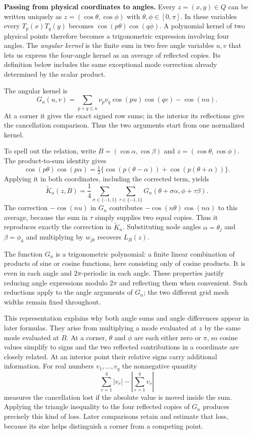 \noindent\textbf{Passing from physical coordinates to angles.}
Every $z=(x,y)\in Q$ can be written uniquely as
$z=(\cos\theta,\cos\phi)$ with $\theta,\phi\in[0,\pi]$.
In these variables every $T_p(x)T_q(y)$ becomes
$\cos(p\theta)\cos(q\phi)$. A polynomial kernel of two physical
points therefore becomes a trigonometric expression involving four
angles. The \emph{angular kernel} is the finite sum in two free angle
variables $u,v$ that lets us express the four-angle kernel as an average
of reflected copies. Its definition below includes the same exceptional
mode correction already determined by the scalar product.

The angular kernel is
\begin{equation}\label{eq:angular-kernel}
 G_n(u,v)=\sum_{p+q\leq n}\nu_p\nu_q\cos(pu)\cos(qv)-\cos(nu).
\end{equation}
At a corner it gives the exact signed row sums; in the interior its
reflections give the cancellation comparison. Thus the two arguments
start from one normalized kernel.

To spell out the relation, write $B=(\cos\alpha,\cos\beta)$ and
$z=(\cos\theta,\cos\phi)$. The product-to-sum identity gives
\[
 \cos(p\theta)\cos(p\alpha)
    =\tfrac12\{\cos(p(\theta-\alpha))+
                         \cos(p(\theta+\alpha))\}.
\]
Applying it in both coordinates, including the corrected term, yields
\[
 \widetilde K_n(z,B)=\frac14\sum_{\sigma\in\{-1,1\}}
                    \sum_{\tau\in\{-1,1\}}
         G_n(\theta+\sigma\alpha,\phi+\tau\beta).
\]
The correction $-\cos(nu)$ in $G_n$ contributes
$-\cos(n\theta)\cos(n\alpha)$ to this average, because the sum in
$\tau$ simply supplies two equal copies. Thus it reproduces exactly
the correction in $\widetilde K_n$. Substituting node angles $\alpha=\theta_j$
and $\beta=\phi_k$ and multiplying by $w_{jk}$ recovers $L_B(z)$.

The function $G_n$ is a trigonometric polynomial: a finite linear
combination of products of sine or cosine functions, here consisting
only of cosine products. It is even in each angle and $2\pi$-periodic
in each angle. These properties justify reducing angle expressions
modulo $2\pi$ and reflecting them when convenient. Such reductions
apply to the angle arguments of $G_n$; the two different grid mesh
widths remain fixed throughout.

This representation explains why both angle sums and angle differences
appear in later formulas. They arise from multiplying a mode evaluated
at $z$ by the same mode evaluated at $B$. At a corner, $\theta$ and
$\phi$ are each either zero or $\pi$, so cosine values simplify to
signs and the two reflected contributions in a coordinate are closely
related. At an interior point their relative signs carry additional
information. For real numbers $v_1,\ldots,v_q$ the nonnegative quantity
\[
 \sum_{r=1}^q|v_r|-\left|\sum_{r=1}^q v_r\right|
\]
measures the cancellation lost if the absolute value is moved inside
the sum. Applying the triangle inequality to the four reflected copies
of $G_n$ produces precisely this kind of loss. Later comparisons retain
and estimate that loss, because its size helps distinguish a corner
from a competing point.

